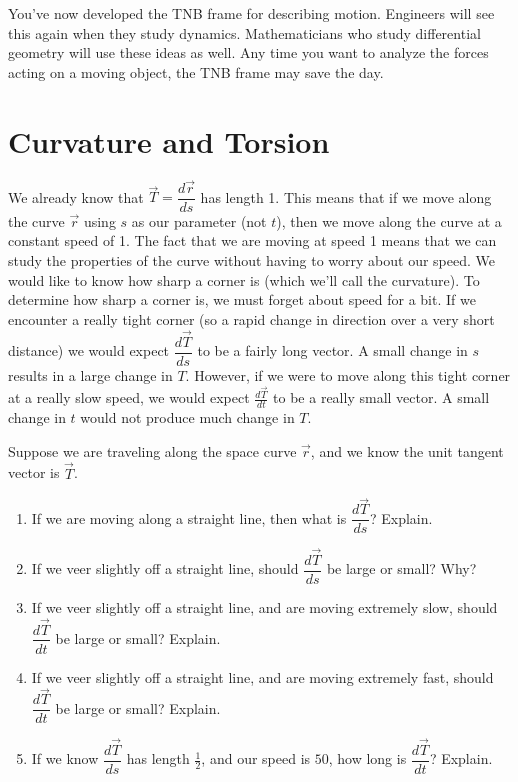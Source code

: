 You've now developed the TNB frame for describing motion. Engineers will see this again when they study dynamics. Mathematicians who study differential geometry will use these ideas as well. Any time you want to analyze the forces acting on a moving object, the TNB frame may save the day.

 
\section{Curvature and Torsion}

We already know that $\vec T=\dfrac{d\vec r}{ds}$ has length 1. This means that if we move along the curve $\vec r$ using $s$ as our parameter (not $t$), then we move along the curve at a constant speed of 1. The fact that we are moving at speed 1 means that we can study the properties of the curve without having to worry about our speed. We would like to know how sharp a corner is (which we'll call the curvature). To determine how sharp a corner is, we must forget about speed for a bit. If we encounter a really tight corner (so a rapid change in direction over a very short distance) we would expect $\dfrac{d\vec T}{ds}$ to be a fairly long vector. A small change in $s$ results in a large change in $T$. However, if we were to move along this tight corner at a really slow speed, we would expect $\frac{d\vec T}{dt}$ to be a really small vector. A small change in $t$ would not produce much change in $T$. 

\begin{problem}%
Suppose we are traveling along the space curve $\vec r$, and we know the unit tangent vector is $\vec T$. 
\begin{enumerate}
 \item If we are moving along a straight line, then what is $\dfrac{d\vec T}{ds}$? Explain.
 \item If we veer slightly off a straight line, should $\dfrac{d\vec T}{ds}$ be large or small? Why?
 \item If we veer slightly off a straight line, and are moving extremely slow, should $\dfrac{d\vec T}{dt}$ be large or small? Explain.
 \item If we veer slightly off a straight line, and are moving extremely fast, should $\dfrac{d\vec T}{dt}$ be large or small? Explain.
 \item If we know $\dfrac{d\vec T}{ds}$ has length $\frac{1}{2}$, and our speed is $50$, how long is $\dfrac{d\vec T}{dt}$? Explain. 
\end{enumerate}
\end{problem}


